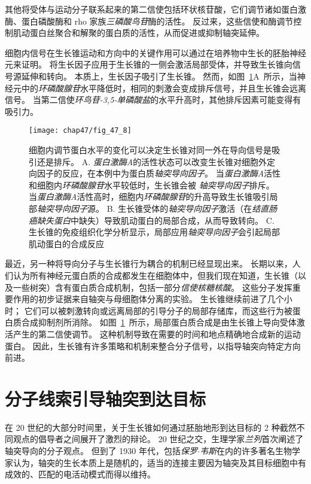 其他将受体与运动分子联系起来的第二信使包括环状核苷酸，它们调节诸如蛋白激酶、蛋白磷酸酶和 rho 家族\textit{三磷酸鸟苷}酶的活性。
反过来，这些信使和酶调节控制肌动蛋白丝聚合和解聚的蛋白质的活性，从而促进或抑制轴突延伸。


细胞内信号在生长锥运动和方向中的关键作用可以通过在培养物中生长的胚胎神经元来证明。
将生长因子应用于生长锥的一侧会激活局部受体，并导致生长锥向信号源延伸和转向。
本质上，生长因子吸引了生长锥。
然而，如图~\ref{fig:47_8}A~所示，当神经元中的\textit{环磷酸腺苷}水平降低时，相同的刺激会变成排斥信号，并且生长锥会远离信号。
当第二信使\textit{环鸟苷-3,5-单磷酸盐}的水平升高时，其他排斥因素可能变得有吸引力。


\begin{figure}[htbp]
	\centering
	\texttt{[image: chap47/fig\_47\_8]}
	\caption{细胞内调节蛋白水平的变化可以决定生长锥对同一外在导向信号是吸引还是排斥。
		A. \textit{蛋白激酶A}的活性状态可以改变生长锥对细胞外定向因子的反应，在本例中为蛋白质\textit{轴突导向因子}。
		当\textit{蛋白激酶A}活性和细胞内\textit{环磷酸腺苷}水平较低时，生长锥会被 \textit{轴突导向因子}排斥。
		当\textit{蛋白激酶A}活性高时，细胞内\textit{环磷酸腺苷}的升高导致生长锥吸引局部\textit{轴突导向因子}源\cite{ming1997camp}。
		B. 生长锥受体的\textit{轴突导向因子}激活（在\textit{结直肠癌缺失蛋白}中缺失）导致肌动蛋白的局部合成，从而导致转向。
		C. 生长锥的免疫组织化学分析显示，局部应用\textit{轴突导向因子}会引起局部肌动蛋白的合成反应\cite{leung2006asymmetrical} }
	\label{fig:47_8}
\end{figure}


最近，另一种将导向分子与生长锥行为耦合的机制已经显现出来。
长期以来，人们认为所有神经元蛋白质的合成都发生在细胞体中，但我们现在知道，生长锥（以及一些树突）含有蛋白质合成机制，包括一部分\textit{信使核糖核酸}。
这些分子发挥重要作用的初步证据来自轴突与母细胞体分离的实验。
生长锥继续前进了几个小时； 它们可以被刺激转向或远离局部的引导分子的局部存储库，而这些行为被蛋白质合成抑制剂所消除。
如图~\ref{fig:47_8}~所示，局部蛋白质合成是由生长锥上导向受体激活产生的第二信使调节。
这种机制导致在需要的时间和地点精确地合成新的运动蛋白。
因此，生长锥有许多策略和机制来整合分子信号，以指导轴突向特定方向前进。



\section{分子线索引导轴突到达目标}

在 20 世纪的大部分时间里，关于生长锥如何通过胚胎地形到达目标的 2 种截然不同观点的倡导者之间展开了激烈的辩论。
20 世纪之交，生理学家\textit{兰列}首次阐述了轴突导向的分子观点。
但到了 1930 年代，包括\textit{保罗$\cdot$韦斯}在内的许多著名生物学家认为，轴突的生长本质上是随机的，适当的连接主要因为轴突及其目标细胞中有成效的、匹配的电活动模式而得以维持。



